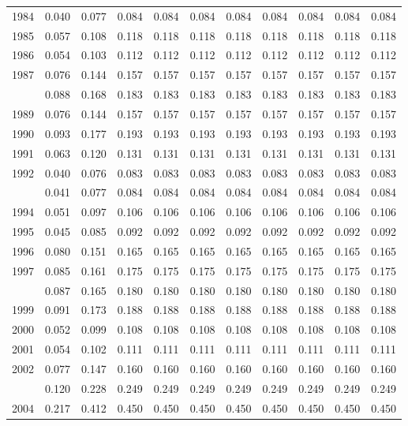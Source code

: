 \documentclass[
]{article}
\begin{document}
\begin{longtable}[t]{lrrrrrrrrrr}
1984 & 0.040 & 0.077 & 0.084 & 0.084 & 0.084 & 0.084 & 0.084 & 0.084 & 0.084 & 0.084\\
1985 & 0.057 & 0.108 & 0.118 & 0.118 & 0.118 & 0.118 & 0.118 & 0.118 & 0.118 & 0.118\\
1986 & 0.054 & 0.103 & 0.112 & 0.112 & 0.112 & 0.112 & 0.112 & 0.112 & 0.112 & 0.112\\
1987 & 0.076 & 0.144 & 0.157 & 0.157 & 0.157 & 0.157 & 0.157 & 0.157 & 0.157 & 0.157\\
\addlinespace
1988 & 0.088 & 0.168 & 0.183 & 0.183 & 0.183 & 0.183 & 0.183 & 0.183 & 0.183 & 0.183\\
1989 & 0.076 & 0.144 & 0.157 & 0.157 & 0.157 & 0.157 & 0.157 & 0.157 & 0.157 & 0.157\\
1990 & 0.093 & 0.177 & 0.193 & 0.193 & 0.193 & 0.193 & 0.193 & 0.193 & 0.193 & 0.193\\
1991 & 0.063 & 0.120 & 0.131 & 0.131 & 0.131 & 0.131 & 0.131 & 0.131 & 0.131 & 0.131\\
1992 & 0.040 & 0.076 & 0.083 & 0.083 & 0.083 & 0.083 & 0.083 & 0.083 & 0.083 & 0.083\\
\addlinespace
1993 & 0.041 & 0.077 & 0.084 & 0.084 & 0.084 & 0.084 & 0.084 & 0.084 & 0.084 & 0.084\\
1994 & 0.051 & 0.097 & 0.106 & 0.106 & 0.106 & 0.106 & 0.106 & 0.106 & 0.106 & 0.106\\
1995 & 0.045 & 0.085 & 0.092 & 0.092 & 0.092 & 0.092 & 0.092 & 0.092 & 0.092 & 0.092\\
1996 & 0.080 & 0.151 & 0.165 & 0.165 & 0.165 & 0.165 & 0.165 & 0.165 & 0.165 & 0.165\\
1997 & 0.085 & 0.161 & 0.175 & 0.175 & 0.175 & 0.175 & 0.175 & 0.175 & 0.175 & 0.175\\
\addlinespace
1998 & 0.087 & 0.165 & 0.180 & 0.180 & 0.180 & 0.180 & 0.180 & 0.180 & 0.180 & 0.180\\
1999 & 0.091 & 0.173 & 0.188 & 0.188 & 0.188 & 0.188 & 0.188 & 0.188 & 0.188 & 0.188\\
2000 & 0.052 & 0.099 & 0.108 & 0.108 & 0.108 & 0.108 & 0.108 & 0.108 & 0.108 & 0.108\\
2001 & 0.054 & 0.102 & 0.111 & 0.111 & 0.111 & 0.111 & 0.111 & 0.111 & 0.111 & 0.111\\
2002 & 0.077 & 0.147 & 0.160 & 0.160 & 0.160 & 0.160 & 0.160 & 0.160 & 0.160 & 0.160\\
\addlinespace
2003 & 0.120 & 0.228 & 0.249 & 0.249 & 0.249 & 0.249 & 0.249 & 0.249 & 0.249 & 0.249\\
2004 & 0.217 & 0.412 & 0.450 & 0.450 & 0.450 & 0.450 & 0.450 & 0.450 & 0.450 & 0.450\\

\end{longtable}
\end{document}
